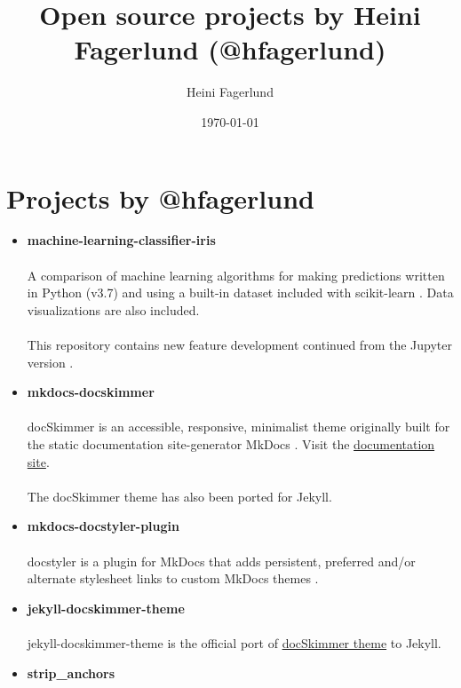 \documentclass[11pt]{article}
\author{Heini Fagerlund}
\date{\today}
\title{Open source projects by Heini Fagerlund (@hfagerlund)}
\begin{document}
\maketitle

\section{Projects by @hfagerlund}
\label{sec-1}
\begin{itemize}
\item \textbf{machine-learning-classifier-iris}
  \paragraph{}
  A comparison of machine learning algorithms for making predictions written in Python (v3.7) and using a built-in dataset included with scikit-learn \cite{machinelearning}. Data visualizations are also included.
\paragraph{}
  This repository contains new feature development continued from the Jupyter version \cite{jupyter}.
\item \textbf{mkdocs-docskimmer}
\paragraph{}
docSkimmer is an accessible, responsive, minimalist theme originally built for the static documentation site-generator MkDocs \cite{mkdocs-docskimmer}. Visit the \href{http://bitsof.bytesofdesign.com/mkdocs-docskimmer/}{documentation site}.
\paragraph{}
The docSkimmer theme has also been ported for Jekyll.
\item \textbf{mkdocs-docstyler-plugin}
\paragraph{}
docstyler is a plugin for MkDocs that adds persistent, preferred
and/or alternate stylesheet links to custom MkDocs themes \cite{mkdocs-docstyler-plugin}.
\item \textbf{jekyll-docskimmer-theme}
   \paragraph{}
  jekyll-docskimmer-theme is the official port of \href{https://github.com/hfagerlund/mkdocs-docskimmer}{docSkimmer theme} to Jekyll.
\item \textbf{strip\_anchors}

\end{itemize}
\end{document}
